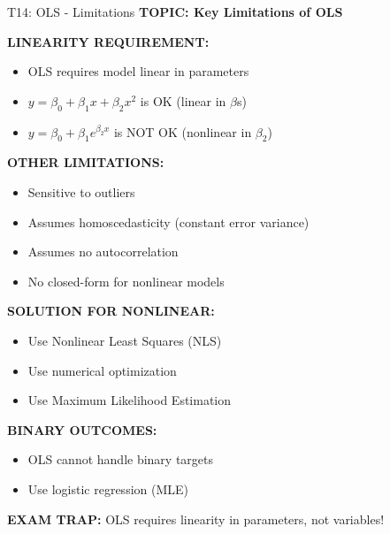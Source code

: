 \documentclass[8pt]{beamer}
\begin{document}
	\begin{frame}{T14: OLS - Limitations}
		\fontsize{6.5}{7.5}\selectfont
		\textbf{TOPIC: Key Limitations of OLS}
		
		\vspace{0.1cm}
		\textbf{LINEARITY REQUIREMENT:}
		\begin{itemize}
			\item OLS requires model linear in parameters
			\item $y = \beta_0 + \beta_1 x + \beta_2 x^2$ is OK (linear in $\beta$s)
			\item $y = \beta_0 + \beta_1 e^{\beta_2 x}$ is NOT OK (nonlinear in $\beta_2$)
		\end{itemize}
		
		\vspace{0.1cm}
		\textbf{OTHER LIMITATIONS:}
		\begin{itemize}
			\item Sensitive to outliers
			\item Assumes homoscedasticity (constant error variance)
			\item Assumes no autocorrelation
			\item No closed-form for nonlinear models
		\end{itemize}
		
		\vspace{0.1cm}
		\textbf{SOLUTION FOR NONLINEAR:}
		\begin{itemize}
			\item Use Nonlinear Least Squares (NLS)
			\item Use numerical optimization
			\item Use Maximum Likelihood Estimation
		\end{itemize}
		
		\vspace{0.1cm}
		\textbf{BINARY OUTCOMES:}
		\begin{itemize}
			\item OLS cannot handle binary targets
			\item Use logistic regression (MLE)
		\end{itemize}
		
		\textcolor{myred}{\textbf{EXAM TRAP:}} OLS requires \textcolor{myblue}{linearity in parameters}, not variables!
	\end{frame}
	
\end{document}
